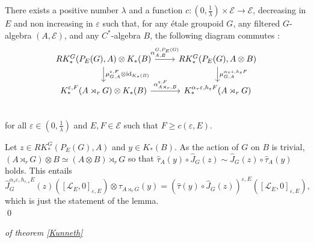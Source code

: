 \begin{lem}
There exists a positive number $\lambda$ and a function $c : (0,\frac{1}{\lambda})\times\mathcal E\rightarrow \mathcal E$, decreasing in $E$ and non increasing in $\varepsilon$ such that, for any étale groupoid $G$, any filtered $G$-algebra $(A,\mathcal E)$, and any $C^*$-algebra $B$, the following diagram commutes :
\[\begin{tikzcd}
RK_*^G(P_E(G),A)\otimes K_*(B) \arrow{r}{\alpha^{G,P_E(G)}_{A,B}}\arrow{d}{\mu_{G,A}^{\varepsilon,F}\otimes \text{id}_{K_*(B)}} & 
RK_*^G(P_E(G),A\otimes B) \arrow{d}{\mu_{G,A}^{\alpha_ \tau\varepsilon,h_\varepsilon F}} \\
K_*^{\varepsilon,F}(A\rtimes_r G)\otimes K_*(B) \arrow{r}{\alpha_{A\rtimes_r,B}^{\varepsilon,F}} & 
K_*^{\alpha_\tau\varepsilon,h_{\varepsilon}F}(A\rtimes_r G)\\
\end{tikzcd}\] 
for all $\varepsilon\in(0,\frac{1}{\lambda})$ and $E,F\in\mathcal E$ such that $F\geq c(\varepsilon,E)$. 
\end{lem}

\begin{dem}
Let $z\in RK_*^G(P_E(G),A)$ and $y\in K_*(B)$. As the action of $G$ on $B$ is trivial, $(A\rtimes_r G)\otimes B\simeq (A\otimes B)\rtimes_r G$ so that $\hat\tau_A(y)\circ \hat J_{G}(z) \sim \hat J_{G}(z)\circ \hat\tau_A(y) $ holds. This entails
\[\hat J_G^{\alpha_\tau\varepsilon, h_{\tau,\varepsilon}E}(z)\left([\mathcal L_E,0]_{\varepsilon, E} \right)\otimes \tau_{A\rtimes_r G}(y) = 
\left( \hat\tau(y)\circ \hat J_G(z) \right)^{\varepsilon, E}\left([\mathcal L_E,0]_{\varepsilon, E}\right),\]
which is just the statement of the lemma.\\
\qed
\end{dem}


\begin{dem} \textit{of theorem \ref{Kunneth}}\\

\end{dem}




























